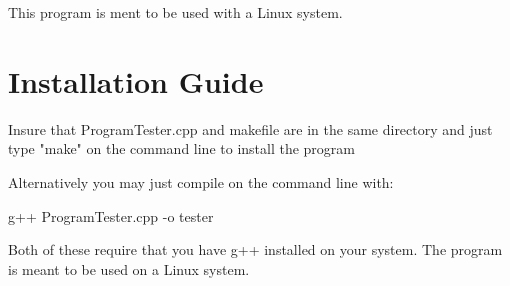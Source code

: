 This program is ment to be used with a Linux system.

\section{Installation Guide}
Insure that ProgramTester.cpp and makefile are in the same
 directory and just type "make" on the command line to install the program
 
 Alternatively you may just compile on the command line with:
 
 g++ ProgramTester.cpp -o tester
  
 Both of these require that you have g++ installed on your system.
 The program is meant to be used on a Linux system.


